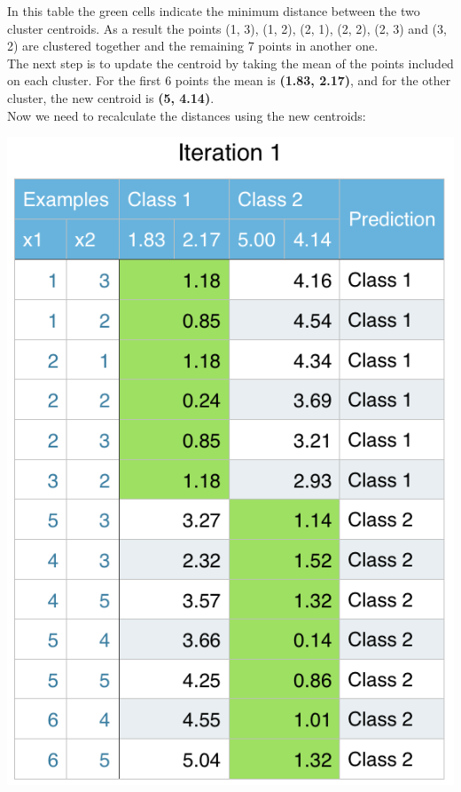 \documentclass[11pt]{article}
\begin{document}
In this table the green cells indicate the minimum distance between the two cluster centroids. As a result the points (1, 3), (1, 2), (2, 1), (2, 2), (2, 3) and (3, 2) are clustered together and the remaining 7 points in another one.\\

The next step is to update the centroid by taking the mean of the points included on each cluster. For the first 6 points the mean is \textbf{(1.83, 2.17)}, and for the other cluster, the new centroid is \textbf{(5, 4.14)}.\\

Now we need to recalculate the distances using the new centroids:
\begin{center}
\includegraphics[scale=0.75]{kmeans-iter1.png}
\end{center}
\end{document}
